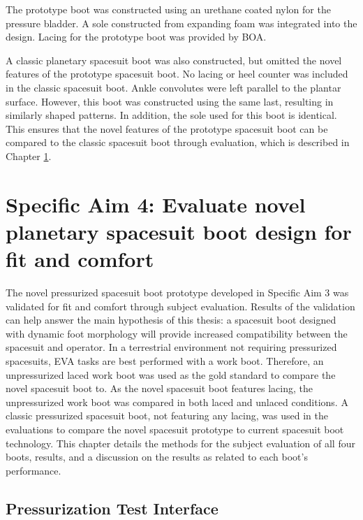\documentclass[defaultstyle,11pt]{comps}
\begin{document}
The prototype boot was constructed using an urethane coated nylon for the pressure bladder.
A sole constructed from expanding foam was integrated into the design.
Lacing for the prototype boot was provided by BOA.

A classic planetary spacesuit boot was also constructed, but omitted the novel features of the prototype spacesuit boot.
No lacing or heel counter was included in the classic spacesuit boot.
Ankle convolutes were left parallel to the plantar surface.
However, this boot was constructed using the same last, resulting in similarly shaped patterns.
In addition, the sole used for this boot is identical.
This ensures that the novel features of the prototype spacesuit boot can be compared to the classic spacesuit boot through evaluation, which is described in Chapter \ref{sec:SA4}.

\hypertarget{sec:SA4}{%
\chapter{Specific Aim 4: Evaluate novel planetary spacesuit boot design for fit and comfort}\label{sec:SA4}}

The novel pressurized spacesuit boot prototype developed in Specific Aim 3 was validated for fit and comfort through subject evaluation.
Results of the validation can help answer the main hypothesis of this thesis: a spacesuit boot designed with dynamic foot morphology will provide increased compatibility between the spacesuit and operator.
In a terrestrial environment not requiring pressurized spacesuits, EVA tasks are best performed with a work boot.
Therefore, an unpressurized laced work boot was used as the gold standard to compare the novel spacesuit boot to.
As the novel spacesuit boot features lacing, the unpressurized work boot was compared in both laced and unlaced conditions.
A classic pressurized spacesuit boot, not featuring any lacing, was used in the evaluations to compare the novel spacesuit prototype to current spacesuit boot technology.
This chapter details the methods for the subject evaluation of all four boots, results, and a discussion on the results as related to each boot's performance.

\hypertarget{pressurization-test-interface}{%
\section{Pressurization Test Interface}\label{pressurization-test-interface}}
\end{document}

